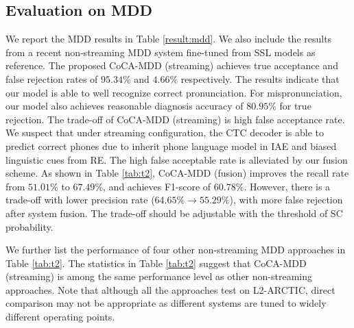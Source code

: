 \documentclass[a4paper]{article}
\begin{document}
\subsection{Evaluation on MDD}
We report the MDD results in Table \ref{result:mdd}. We also include the results from a recent non-streaming MDD system fine-tuned from SSL models \cite{peng2021study} as reference. %
The proposed CoCA-MDD (streaming) achieves true
acceptance and false rejection rates of $95.34\%$ and $4.66\%$  respectively. The results indicate that our model is able to well recognize correct pronunciation. For mispronunciation, our model also achieves reasonable diagnosis accuracy of $80.95\%$ for true rejection. The trade-off of CoCA-MDD (streaming) is high false acceptance rate. We suspect that under streaming configuration, the CTC decoder is able to predict correct phones due to inherit phone language model in IAE and biased linguistic cues from RE.
The high false acceptable rate is alleviated
by our fusion scheme. As shown in Table \ref{tab:t2}, CoCA-MDD (fusion) improves the recall rate from $51.01\%$ to $67.49\%$, and achieves F1-score of $60.78\%$. However, there is a trade-off with lower precision rate ($64.65\% \rightarrow 55.29\%$), with more false rejection after system fusion. The trade-off should be adjustable with the threshold of SC probability. 

We further list the performance of four other non-streaming MDD approaches in Table \ref{tab:t2}. The statistics in Table \ref{tab:t2} suggest that CoCA-MDD (streaming) is among the same performance level as other non-streaming approaches. Note that although all the approaches test on L2-ARCTIC, direct comparison may not be appropriate as different systems are tuned to widely different operating points.


\end{document}
